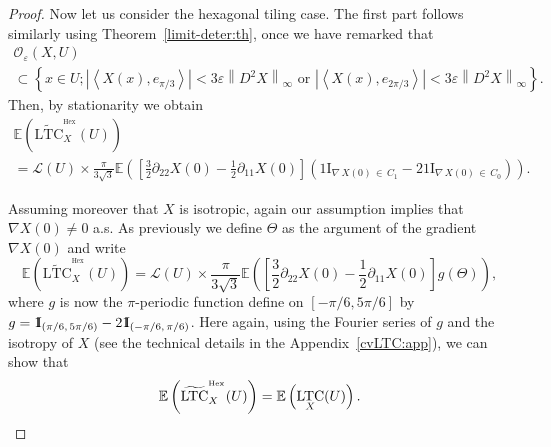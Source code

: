 \documentclass[AHL,Unicode,longabstracts,published]{cedram}
\newcommand{\E}{\mathbb{E}}
\newcommand{\ind}{{1\!\!\mathrm{I}}}
\newcommand{\eps}{\varepsilon}
\DeclareMathOperator{\LTC}{LTC}
\DeclareMathOperator{\Hex}{Hex}
\newcommand{\tLTC}{\widetilde{\mathrm{LTC}}}
\newcommand{\calL}{\mathcal{L}}
\newcommand{\calO}{\mathcal{O}}
\begin{document}
\begin{proof}

Now let us consider the hexagonal tiling case. The first part follows similarly using Theorem~\ref{limit-deter:th}, once we have remarked that
\begin{multline*}
{\calO}_{\eps}(X,U)\\
\subset \left\{ x\in U ;\left|\left\langle X(x), e_{\pi/3}\right\rangle\right|<3\eps\left\|D^2X\right\|_\infty \text{ or } \left|\left\langle X(x), e_{2\pi/3}\right\rangle\right|<3\eps\left\|D^2X\right\|_\infty\right\}.
\end{multline*}
Then, by stationarity we obtain
\begin{multline*}
\E\left(\tLTC^{^{\Hex}}_{X}(U)\right)\\
={\calL}(U)\times \frac{\pi}{3\sqrt{3}}\E\left(\left[\frac{3}{2}\partial_{22}X(0)
-\frac{1}{2}\partial_{11}X(0)\right]\left(\ind_{\nabla\,X(0)\,\in\,C_1}-2\ind_{\nabla\,X(0)\,\in\,C_0}\right)\right).
\end{multline*}

\pagebreak

Assuming moreover that $X$ is isotropic, again our assumption implies that $\nabla X(0)\neq 0$ a.s. As previously we define $\Theta$ as the argument of the gradient $\nabla X(0)$ and write
\[
\E\left(\tLTC^{^{\Hex}}_{X}(U)\right)=
\calL(U)\times
\frac{\pi}{3\sqrt{3}}\E\left(\left[\frac{3}{2}\partial_{22}X(0)
-\frac{1}{2}\partial_{11}X(0)\right]g(\Theta)\right),
\]
where $g$ is now the $\pi$-periodic function define on $[-\pi/6,5\pi/6]$ by $g=\ind_{(\pi/6,\,5\pi/6)}\linebreak-2\ind_{(-\pi/6,\,\pi/6)}$. Here again, using the Fourier series of $g$ and the isotropy of $X$ (see the technical details in the Appendix~\ref{cvLTC:app}), we can show that
\[
\E\left(\tLTC^{^{\Hex}}_{X}(U)\right) =\E\left(\LTC_X(U)\right).\qedhere
\]
\end{proof}
\end{document}
